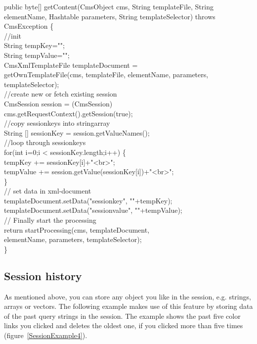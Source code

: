\begin{java}
public byte[] getContent(CmsObject cms, String templateFile,
String elementName, Hashtable parameters, String templateSelector)
throws CmsException \{\\
\jtabc        //init\\
\jtabc        String tempKey="";\\
\jtabc        String tempValue="";\\
CmsXmlTemplateFile templateDocument =\\
getOwnTemplateFile(cms, templateFile, elementName, parameters,\\
templateSelector);\\
\jtabc        //create new or fetch existing session\\
CmsSession session = (CmsSession)\\
cms.getRequestContext().getSession(true);\\
\jtabc        //copy sessionkeys into stringarray\\
String [] sessionKey = session.getValueNames();\\
\jtabc        //loop through sessionkeys\\
\jtabc        for(int i=0;i < sessionKey.length;i++) \{\\
\jtabd                tempKey += sessionKey[i]+"<br>";\\
tempValue += session.getValue(sessionKey[i])+"<br>";\\
\}\\
\jtabc        // set data in xml-document\\
\jtabc        templateDocument.setData("sessionkey", ""+tempKey);\\
templateDocument.setData("sessionvalue", ""+tempValue);\\
\jtabd                // Finally start the processing\\
\jtabc        return startProcessing(cms, templateDocument,\\
elementName, parameters, templateSelector);\\
\}\\
\end{java}

\subsection {Session history}
As mentioned above, you can store any object you like in the session,
e.g. strings, arrays or vectors. The following example makes use of this
feature by storing data of the past query strings in the session. The
example shows the past five color links you clicked and deletes the
oldest one, if you clicked more than five times (figure~\ref{SessionExample4}).

